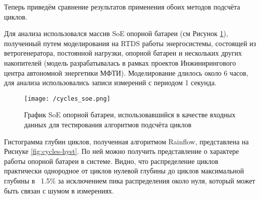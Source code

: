 \begin{enumerate}
\begin{algorithm}
\begin{algorithmic}[1]
 
\EndFunction
\Statex

     
    \EndWhile
\EndIf
{}
    \EndWhile
    
\EndIf
{}
\EndWhile
 
\end{algorithmic}
\end{algorithm}

\end{enumerate}

Теперь приведём сравнение результатов применения обоих методов подсчёта циклов.

Для анализа использовался массив SoE опорной батареи (см Рисунок \ref{fig:core-cycles-line}), полученный путем моделирования на RTDS работы энергосистемы, состоящей из ветрогенератора, постоянной нагрузки, опорной батареи и нескольких других накопителей (модель разрабатывалась в рамках проектов Инжинирингового центра автономной энергетики МФТИ).
Моделирование длилось около 6 часов, для анализа использовались записи измерений с периодом 1 секунда.

\begin{figure}[h]
\texttt{[image: /cycles\_soe.png]}
\caption{График SoE опорной батареи, использовавшийся в качестве входных данных для тестирования алгоритмов подсчёта циклов}
\centering
\label{fig:core-cycles-line}
\end{figure}

\medskip

Гистограмма глубин циклов, полученная алгоритмом Rainflow, представлена на Риснуке \ref{fig:cycles-hyst}.
По ней можно получить представление о характере работы опорной батареи в системе.
Видно, что распределение циклов практически однородное от циклов нулевой глубины до циклов максимальной глубины в ~1.5\% за исключением пика распределения около нуля, который может быть связан с шумом в измерениях.

